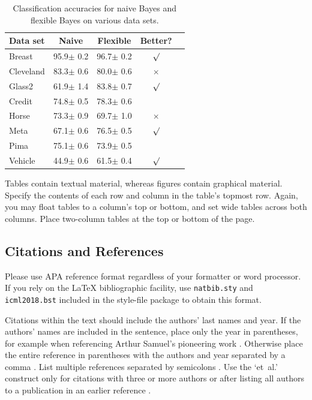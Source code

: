 \documentclass{article}
\begin{document}
\begin{table}[t]
\caption{Classification accuracies for naive Bayes and flexible
Bayes on various data sets.}
\label{sample-table}
\vskip 0.15in
\begin{center}
\begin{small}
\begin{sc}
\begin{tabular}{lcccr}
\toprule
Data set & Naive & Flexible & Better? \\
\midrule
Breast    & 95.9$\pm$ 0.2& 96.7$\pm$ 0.2& $\surd$ \\
Cleveland & 83.3$\pm$ 0.6& 80.0$\pm$ 0.6& $\times$\\
Glass2    & 61.9$\pm$ 1.4& 83.8$\pm$ 0.7& $\surd$ \\
Credit    & 74.8$\pm$ 0.5& 78.3$\pm$ 0.6&         \\
Horse     & 73.3$\pm$ 0.9& 69.7$\pm$ 1.0& $\times$\\
Meta      & 67.1$\pm$ 0.6& 76.5$\pm$ 0.5& $\surd$ \\
Pima      & 75.1$\pm$ 0.6& 73.9$\pm$ 0.5&         \\
Vehicle   & 44.9$\pm$ 0.6& 61.5$\pm$ 0.4& $\surd$ \\
\bottomrule
\end{tabular}
\end{sc}
\end{small}
\end{center}
\vskip -0.1in
\end{table}

Tables contain textual material, whereas figures contain graphical material.
Specify the contents of each row and column in the table's topmost
row. Again, you may float tables to a column's top or bottom, and set
wide tables across both columns. Place two-column tables at the
top or bottom of the page.

\subsection{Citations and References}

Please use APA reference format regardless of your formatter
or word processor. If you rely on the \LaTeX\/ bibliographic
facility, use \texttt{natbib.sty} and \texttt{icml2018.bst}
included in the style-file package to obtain this format.

Citations within the text should include the authors' last names and
year. If the authors' names are included in the sentence, place only
the year in parentheses, for example when referencing Arthur Samuel's
pioneering work . Otherwise place the entire
reference in parentheses with the authors and year separated by a
comma \cite{Samuel59}. List multiple references separated by
semicolons \cite{kearns89,Samuel59,mitchell80}. Use the `et~al.'
construct only for citations with three or more authors or after
listing all authors to a publication in an earlier reference \cite{MachineLearningI}.
\end{document}
